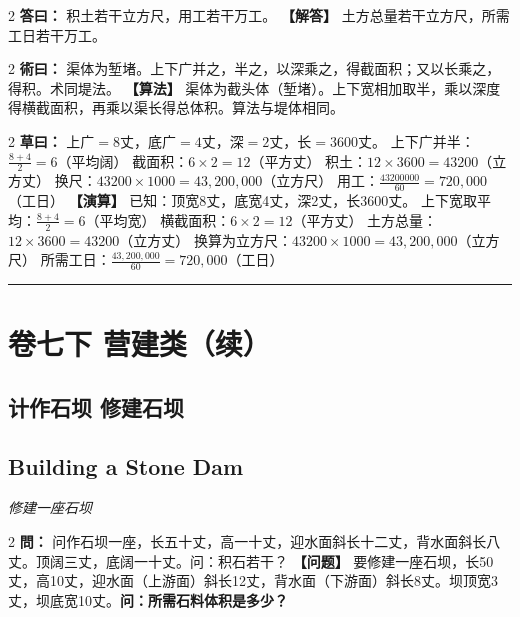\documentclass[11pt,a4paper]{article}
\newcommand{\longline}{\noindent\rule{\textwidth}{0.4pt}}
\newcommand{\bilingualProblem}[2]{%
  \vspace{0.6em}%
  \begin{paracol}{2}%
  \noindent\textcolor{problemcolor}{\textbf{問：}}#1%
  \switchcolumn%
  \noindent\textcolor{problemcolor}{\textbf{【问题】}}#2%
  \end{paracol}%
  \vspace{0.3em}%
}
\newcommand{\bilingualAnswer}[2]{%
  \begin{paracol}{2}%
  \noindent\textcolor{answercolor}{\textbf{答曰：}}#1%
  \switchcolumn%
  \noindent\textcolor{answercolor}{\textbf{【解答】}}#2%
  \end{paracol}%
  \vspace{0.3em}%
}
\newcommand{\bilingualMethod}[2]{%
  \begin{paracol}{2}%
  \noindent\textcolor{methodcolor}{\textbf{術曰：}}#1%
  \switchcolumn%
  \noindent\textcolor{methodcolor}{\textbf{【算法】}}#2%
  \end{paracol}%
  \vspace{0.3em}%
}
\newcommand{\bilingualWorking}[2]{%
  \begin{paracol}{2}%
  \noindent\textcolor{workingcolor}{\textbf{草曰：}}#1%
  \switchcolumn%
  \noindent\textcolor{workingcolor}{\textbf{【演算】}}#2%
  \end{paracol}%
  \vspace{0.3em}%
}
\newcommand{\bilingualSubsection}[2]{%
  \subsection{#1}
  \begin{center}
  {\small\color{sectioncolor}\textit{#2}}
  \end{center}
  \vspace{0.3em}
}
\begin{document}
\bilingualAnswer{%
积土若干立方尺，用工若干万工。%
}{%
土方总量若干立方尺，所需工日若干万工。%
}

\bilingualMethod{%
渠体为堑堵。上下广并之，半之，以深乘之，得截面积；又以长乘之，得积。术同堤法。%
}{%
渠体为截头体（堑堵）。上下宽相加取半，乘以深度得横截面积，再乘以渠长得总体积。算法与堤体相同。%
}

\bilingualWorking{%
上广$=8$丈，底广$=4$丈，深$=2$丈，长$=3600$丈。
上下广并半：$\displaystyle\frac{8+4}{2} = 6$（平均阔）
截面积：$6 \times 2 = 12$（平方丈）
积土：$12 \times 3600 = 43200$（立方丈）
换尺：$43200 \times 1000 = 43{,}200{,}000$（立方尺）
用工：$\displaystyle\frac{43200000}{60} = 720{,}000$（工日）%
}{%
已知：顶宽8丈，底宽4丈，深2丈，长3600丈。
上下宽取平均：$\displaystyle\frac{8+4}{2} = 6$（平均宽）
横截面积：$6 \times 2 = 12$（平方丈）
土方总量：$12 \times 3600 = 43200$（立方丈）
换算为立方尺：$43200 \times 1000 = 43{,}200{,}000$（立方尺）
所需工日：$\displaystyle\frac{43{,}200{,}000}{60} = 720{,}000$（工日）%
}

\vspace{0.5em}
\longline

\newpage
\section{卷七下 \quad 营建类（续）}
\label{sec:fasc7b}

\begin{center}
\end{center}

\medskip

\subsection{计作石坝 \quad 修建石坝}
\bilingualSubsection{Building a Stone Dam}{修建一座石坝}

\bilingualProblem{%
问作石坝一座，长五十丈，高一十丈，迎水面斜长十二丈，背水面斜长八丈。顶阔三丈，底阔一十丈。问：积石若干？%
}{%
要修建一座石坝，长50丈，高10丈，迎水面（上游面）斜长12丈，背水面（下游面）斜长8丈。坝顶宽3丈，坝底宽10丈。\textbf{问：所需石料体积是多少？}%
}
\end{document}
